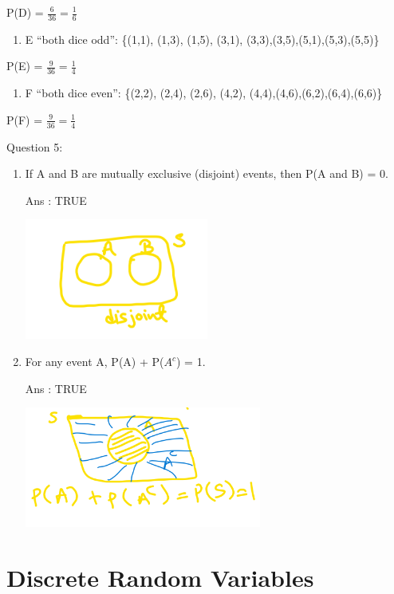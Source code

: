 \documentclass[
]{book}
\providecommand{\tightlist}{%
  \setlength{\itemsep}{0pt}\setlength{\parskip}{0pt}}
\begin{document}
P(D) = \(\frac{6}{36}=\frac{1}{6}\)

\begin{enumerate}
\def\labelenumi{\alph{enumi})}
\setcounter{enumi}{4}
\tightlist
\item
  E ``both dice odd'': \{(1,1), (1,3), (1,5), (3,1), (3,3),(3,5),(5,1),(5,3),(5,5)\}
\end{enumerate}

P(E) = \(\frac{9}{36}=\frac{1}{4}\)

\begin{enumerate}
\def\labelenumi{\alph{enumi})}
\setcounter{enumi}{5}
\tightlist
\item
  F ``both dice even'': \{(2,2), (2,4), (2,6), (4,2), (4,4),(4,6),(6,2),(6,4),(6,6)\}
\end{enumerate}

P(F) = \(\frac{9}{36}=\frac{1}{4}\)

Question 5:

\begin{enumerate}
\def\labelenumi{\alph{enumi})}
\item
  If A and B are mutually exclusive (disjoint) events, then P(A and B) = 0.

  Ans : TRUE

  \includegraphics[width=2.375in,height=\textheight]{images/img17.png}
\item
  For any event A, P(A) + P(\(A^c\)) = 1.

  Ans : TRUE

  \includegraphics[width=3.0625in,height=\textheight]{images/img18.png}
\end{enumerate}

\section{Discrete Random Variables}\label{discrete-random-variables}
\end{document}
